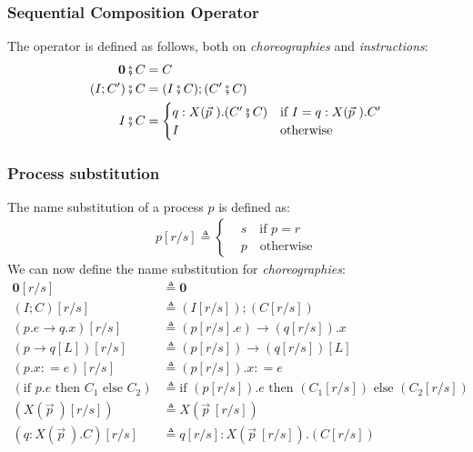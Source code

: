 \documentclass[12pt,a4paper,twoside]{book}
\newcommand{\metaDef}{\mathrel{\mathop:}=}
\newcommand{\gencom}{p.e \rightarrow q.x}
\newcommand{\gensel}{p \rightarrow q[L]}
\begin{document}
\subsubsection{Sequential Composition Operator}
The operator is defined as follows, both on \textit{choreographies} and \textit{instructions}:
\begin{align*}
	\boldsymbol{0} \fatsemi C &= C\\
    (I; C') \fatsemi C &= (I \fatsemi C); (C' \fatsemi C)\\
    I \fatsemi C &= 
    \begin{cases}
		q : X(\vec{p}~).(C' \fatsemi C) &\text{if $I = q : X(\vec{p}~).C' $}\\
		I &\text{otherwise}
    \end{cases}
\end{align*}

\subsubsection{Process substitution}
The name substitution of a process $p$ is defined as:
\begin{align*}
    p[r/s] \triangleq
    \begin{cases}
    &s \quad \text{if $p = r$}\\
    &p \quad \text{otherwise}
    \end{cases}
\end{align*}
We can now define the name substitution for \textit{choreographies}:
\begin{align*}
	\boldsymbol{0}[r/s] &\triangleq \boldsymbol{0}\\
    (I; C)[r/s] &\triangleq (I[r/s]); (C[r/s])\\
    (\gencom)[r/s] &\triangleq (p[r/s].e) \rightarrow (q[r/s]).x\\
    (\gensel)[r/s] &\triangleq (p[r/s]) \rightarrow (q[r/s])[L]\\
    (p.x \metaDef e)[r/s] &\triangleq (p[r/s]).x \metaDef e\\
    (\text{if } p.e\text{ then } C_1\text{ else } C_2) &\triangleq \text{if }(p[r/s]).e \text{ then }(C_1[r/s]) \text{ else } (C_2[r/s])\\
    (X(\vec{p}~)[r/s]) &\triangleq X(\vec{p}~[r/s])\\
	(q : X(\vec{p}~).C) [r/s] &\triangleq q[r/s] : X(\vec{p}~[r/s]).(C[r/s])\\
\end{align*}
\end{document}
